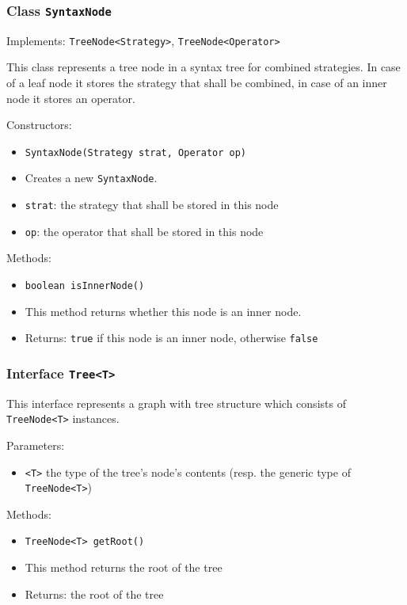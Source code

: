 \documentclass[parskip=full,11pt]{scrartcl}
\begin{document}
\subsubsection{Class \texttt{SyntaxNode}}
Implements: \texttt{TreeNode<Strategy>}, \texttt{TreeNode<Operator>}

This class represents a tree node in a syntax tree for combined strategies. In case of a leaf node it stores the strategy that shall be combined, in case of an inner node it stores an operator.

Constructors:
\begin{itemize} \itemsep -10pt
	\item \texttt{SyntaxNode(Strategy strat, Operator op)}
	\item[] Creates a new \texttt{SyntaxNode}.
	\item[] \texttt{strat}: the strategy that shall be stored in this node
	\item[] \texttt{op}: the operator that shall be stored in this node
\end{itemize}

Methods:
\begin{itemize} \itemsep -10pt
	\item \texttt{boolean isInnerNode()}
	\item[] This method returns whether this node is an inner node.
	\item[] Returns: \texttt{true} if this node is an inner node, otherwise \texttt{false}
\end{itemize}

\subsubsection{Interface \texttt{Tree<T>}}

This interface represents a graph with tree structure which consists of \texttt{TreeNode<T>} instances.

Parameters:
\begin{itemize} \itemsep -10pt
	\item \texttt{<T>} the type of the tree's node's contents (resp. the generic type of \texttt{TreeNode<T>})
\end{itemize}

Methods:
\begin{itemize}\itemsep -10pt
	\item \texttt{TreeNode<T> getRoot()}
	\item[] This method returns the root of the tree
	\item[] Returns: the root of the tree
\end{itemize}
\end{document}
